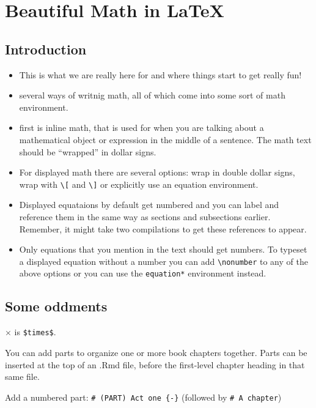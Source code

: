 \documentclass[
]{book}
\begin{document}
\hypertarget{beautiful-math-in-latex}{%
\chapter{Beautiful Math in LaTeX}\label{beautiful-math-in-latex}}

\hypertarget{introduction}{%
\section{Introduction}\label{introduction}}

\begin{itemize}
\item
  This is what we are really here for and where things start to get really fun!
\item
  several ways of writnig math, all of which come into some sort of math environment.
\item
  first is inline math, that is used for when you are talking about a mathematical object or expression in the middle of a sentence. The math text should be ``wrapped'' in dollar signs.
\item
  For displayed math there are several options: wrap in double dollar signs, wrap with \texttt{\textbackslash{}{[}} and \texttt{\textbackslash{}{]}} or explicitly use an equation environment.
\item
  Displayed equataions by default get numbered and you can label and reference them in the same way as sections and subsections earlier. Remember, it might take two compilations to get these references to appear.
\item
  Only equations that you mention in the text should get numbers. To typeset a displayed equation without a number you can add \texttt{\textbackslash{}nonumber} to any of the above options or you can use the \texttt{equation*} environment instead.
\end{itemize}

\hypertarget{some-oddments}{%
\section{Some oddments}\label{some-oddments}}

\(\times\) is \texttt{\$times\$}.

You can add parts to organize one or more book chapters together. Parts can be inserted at the top of an .Rmd file, before the first-level chapter heading in that same file.

Add a numbered part: \texttt{\#\ (PART)\ Act\ one\ \{-\}} (followed by \texttt{\#\ A\ chapter})
\end{document}
